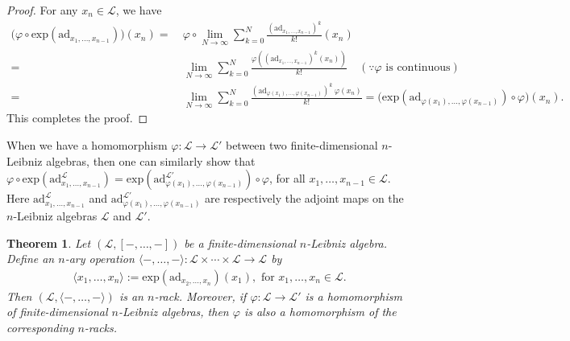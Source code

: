 \documentclass[a4paper,reqno,10pt]{amsart}
\theoremstyle{plain}
\newtheorem{thm}{Theorem}[section]
\theoremstyle{definition}
\theoremstyle{remark}
\begin{document}
\begin{proof}
    For any $x_n \in \mathcal{L}$, we have
    \begin{align*}
         \big( \varphi \circ \mathrm{exp} (\mathrm{ad}_{x_1, \ldots, x_{n-1}}) \big) (x_n) =~& \varphi \circ \lim_{N \rightarrow \infty} \sum_{k=0}^N \frac{(\mathrm{ad}_{x_1, \ldots, x_{n-1}})^k}{k ! } (x_n) \\
         =~& \lim_{N \rightarrow \infty} \sum_{k=0}^N \frac{ \varphi ( (\mathrm{ad}_{x_1, \ldots, x_{n-1}})^k (x_n))}{k ! } \quad (\because \varphi \text{ is continuous}) \\
         =~& \lim_{N \rightarrow \infty} \sum_{k=0}^N \frac{ (\mathrm{ad}_{\varphi (x_1), \ldots, \varphi ( x_{n-1})})^k ~ \! \varphi (x_n) }{k!} = \big(  \mathrm{exp} (\mathrm{ad}_{\varphi (x_1), \ldots, \varphi (x_{n-1})}) \circ \varphi    \big) (x_n).
    \end{align*}
    This completes the proof.
\end{proof}

When we have a homomorphism $\varphi : \mathcal{L} \rightarrow \mathcal{L}'$ between two finite-dimensional $n$-Leibniz algebras, then one can similarly show that 
$ \varphi \circ \mathrm{exp} (\mathrm{ad}^{\mathcal{L}}_{x_1, \ldots, x_{n-1}}) = \mathrm{exp} (\mathrm{ad}^{\mathcal{L}'}_{\varphi (x_1), \ldots, \varphi (x_{n-1})}) \circ \varphi$, for all $x_1, \ldots, x_{n-1} \in \mathcal{L}$. Here $\mathrm{ad}^{\mathcal{L}}_{x_1, \ldots, x_{n-1}}$ and $\mathrm{ad}^{\mathcal{L}'}_{\varphi (x_1), \ldots, \varphi (x_{n-1})}$ are respectively the adjoint maps on the $n$-Leibniz algebras $\mathcal{L}$ and $\mathcal{L}'$.

\begin{thm}\label{thm-nleibniz-nrack}
    Let $(\mathcal{L}, [-, \ldots, -])$ be a finite-dimensional $n$-Leibniz algebra. Define an $n$-ary operation $\langle - , \ldots, - \rangle : \mathcal{L} \times \cdots \times \mathcal{L} \rightarrow \mathcal{L}$ by
    \begin{align*}
        \langle x_1, \ldots, x_n \rangle := \mathrm{exp} (\mathrm{ad}_{x_2, \ldots, x_n}) (x_1), \text{ for } x_1, \ldots, x_n \in \mathcal{L}.
    \end{align*}
    Then $(\mathcal{L}, \langle -, \ldots, - \rangle)$ is an $n$-rack. Moreover, if $\varphi: \mathcal{L} \rightarrow \mathcal{L}'$ is a homomorphism of finite-dimensional $n$-Leibniz algebras, then $\varphi$ is also a homomorphism of the corresponding $n$-racks.
\end{thm}
\end{document}
